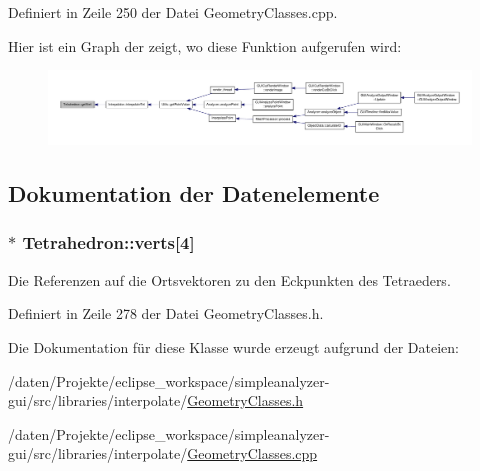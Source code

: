 Definiert in Zeile 250 der Datei Geometry\-Classes.\-cpp.



Hier ist ein Graph der zeigt, wo diese Funktion aufgerufen wird\-:\nopagebreak
\begin{figure}[H]
\begin{center}
\leavevmode
\includegraphics[width=350pt]{classTetrahedron_a88afe41ae5991168ad51ba4dbb2e1a6b_icgraph}
\end{center}
\end{figure}




\subsection{Dokumentation der Datenelemente}
\hypertarget{classTetrahedron_a4bb7ad83965859998a622b35a97ad935}{
\subsubsection[{verts}]{$\ast$ Tetrahedron\-::verts\mbox{[}4\mbox{]}\hspace{0.3cm}{\ttfamily [private]}}}\label{classTetrahedron_a4bb7ad83965859998a622b35a97ad935}


Die Referenzen auf die Ortsvektoren zu den Eckpunkten des Tetraeders. 



Definiert in Zeile 278 der Datei Geometry\-Classes.\-h.



Die Dokumentation für diese Klasse wurde erzeugt aufgrund der Dateien\-:\begin{DoxyCompactItemize}
\item 
/daten/\-Projekte/eclipse\-\_\-workspace/simpleanalyzer-\/gui/src/libraries/interpolate/\hyperlink{GeometryClasses_8h}{Geometry\-Classes.\-h}\item 
/daten/\-Projekte/eclipse\-\_\-workspace/simpleanalyzer-\/gui/src/libraries/interpolate/\hyperlink{GeometryClasses_8cpp}{Geometry\-Classes.\-cpp}\end{DoxyCompactItemize}
